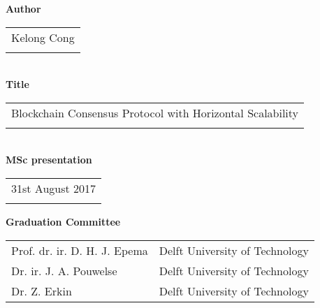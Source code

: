 \thispagestyle{empty}

\noindent \textbf{Author}\\
\begin{tabular}{l}
Kelong Cong\\
\\
\end{tabular}\\
\noindent \textbf{Title}\\
\begin{tabular}{l}
Blockchain Consensus Protocol with Horizontal Scalability\\
\\
\end{tabular}\\
\noindent \textbf{MSc presentation}\\
\begin{tabular}{l}
31st August 2017\\
\\
\end{tabular}

\vspace{1.1cm}

\noindent \textbf{Graduation Committee}\\
\begin{tabular}{ll}
Prof. dr. ir. D. H. J. Epema            & Delft University of Technology \\
Dr. ir. J. A. Pouwelse                  & Delft University of Technology \\
Dr. Z. Erkin                            & Delft University of Technology \\
\end{tabular}

